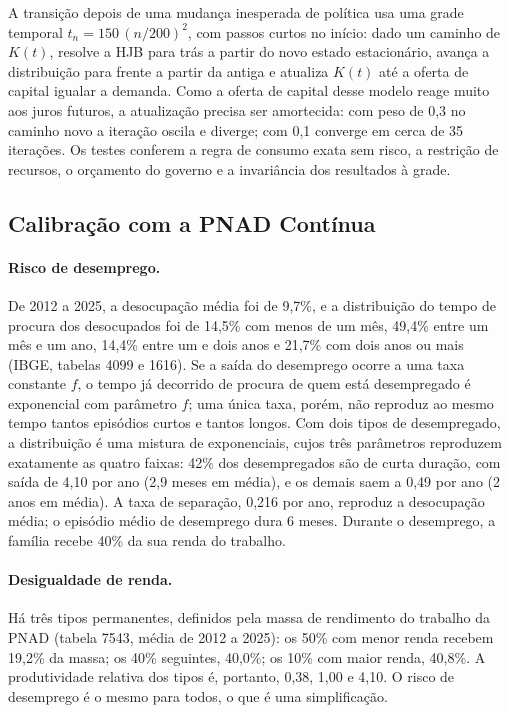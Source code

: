 \documentclass[11pt,a4paper]{article}
\begin{document}
A transição depois de uma mudança inesperada de política usa uma grade temporal
$t_n=150\,(n/200)^2$, com passos curtos no início: dado um caminho de $K(t)$,
resolve a HJB para trás a partir do novo estado estacionário, avança a
distribuição para frente a partir da antiga e atualiza $K(t)$ até a oferta de
capital igualar a demanda. Como a oferta de capital desse modelo reage muito aos
juros futuros, a atualização precisa ser amortecida: com peso de 0,3 no caminho
novo a iteração oscila e diverge; com 0,1 converge em cerca de 35 iterações.
Os testes conferem a regra de consumo exata sem risco, a restrição de recursos,
o orçamento do governo e a invariância dos resultados à grade.

\subsection{Calibração com a PNAD Contínua}
\paragraph{Risco de desemprego.} De 2012 a 2025, a desocupação média foi de 9,7\%,
e a distribuição do tempo de procura dos desocupados foi de 14,5\% com menos de
um mês, 49,4\% entre um mês e um ano, 14,4\% entre um e dois anos e 21,7\% com
dois anos ou mais (IBGE, tabelas 4099 e 1616). Se a saída do desemprego ocorre
a uma taxa constante $f$, o tempo já decorrido de procura de quem está
desempregado é exponencial com parâmetro $f$; uma única taxa, porém, não
reproduz ao mesmo tempo tantos episódios curtos e tantos longos. Com dois tipos
de desempregado, a distribuição é uma mistura de exponenciais, cujos três
parâmetros reproduzem exatamente as quatro faixas: 42\% dos desempregados são de
curta duração, com saída de 4,10 por ano (2,9 meses em média), e os demais saem
a 0,49 por ano (2 anos em média). A taxa de separação, 0,216 por ano, reproduz a
desocupação média; o episódio médio de desemprego dura 6 meses. Durante o
desemprego, a família recebe 40\% da sua renda do trabalho.

\paragraph{Desigualdade de renda.} Há três tipos permanentes, definidos pela
massa de rendimento do trabalho da PNAD (tabela 7543, média de 2012 a 2025): os
50\% com menor renda recebem 19,2\% da massa; os 40\% seguintes, 40,0\%; os
10\% com maior renda, 40,8\%. A produtividade relativa dos tipos é, portanto,
0,38, 1,00 e 4,10. O risco de desemprego é o mesmo para todos, o que é uma
simplificação.
\end{document}
